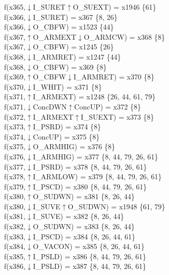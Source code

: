 f(x365,$\downarrow$I\_SURET$\uparrow$O\_SUEXT) = x1946 \{61\} \\  
f(x366,$\downarrow$I\_SURET) = x367 \{8, 26\} \\  
f(x366,$\downarrow$O\_CBFW) = x1523 \{44\} \\  
f(x367,$\uparrow$O\_ARMEXT$\downarrow$O\_ARMCW) = x368 \{8\} \\  
f(x367,$\downarrow$O\_CBFW) = x1245 \{26\} \\  
f(x368,$\downarrow$I\_ARMRET) = x1247 \{44\} \\  
f(x368,$\downarrow$O\_CBFW) = x369 \{8\} \\  
f(x369,$\uparrow$O\_CBFW$\downarrow$I\_ARMRET) = x370 \{8\} \\  
f(x370,$\downarrow$I\_WHIT) = x371 \{8\} \\  
f(x371,$\uparrow$I\_ARMEXT) = x1248 \{26, 44, 61, 79\} \\  
f(x371,$\downarrow$ConcDWN$\uparrow$ConcUP) = x372 \{8\} \\  
f(x372,$\uparrow$I\_ARMEXT$\uparrow$I\_SUEXT) = x373 \{8\} \\  
f(x373,$\uparrow$I\_PSRD) = x374 \{8\} \\  
f(x374,$\downarrow$ConcUP) = x375 \{8\} \\  
f(x375,$\downarrow$O\_ARMHIG) = x376 \{8\} \\  
f(x376,$\downarrow$I\_ARMHIG) = x377 \{8, 44, 79, 26, 61\} \\  
f(x377,$\downarrow$I\_PSRD) = x378 \{8, 44, 79, 26, 61\} \\  
f(x378,$\uparrow$I\_ARMLOW) = x379 \{8, 44, 79, 26, 61\} \\  
f(x379,$\uparrow$I\_PSCD) = x380 \{8, 44, 79, 26, 61\} \\  
f(x380,$\uparrow$O\_SUDWN) = x381 \{8, 26, 44\} \\  
f(x380,$\downarrow$I\_SUVE$\uparrow$O\_SUDWN) = x1948 \{61, 79\} \\  
f(x381,$\downarrow$I\_SUVE) = x382 \{8, 26, 44\} \\  
f(x382,$\downarrow$O\_SUDWN) = x383 \{8, 26, 44\} \\  
f(x383,$\downarrow$I\_PSCD) = x384 \{8, 26, 44, 61\} \\  
f(x384,$\downarrow$O\_VACON) = x385 \{8, 26, 44, 61\} \\  
f(x385,$\uparrow$I\_PSLD) = x386 \{8, 44, 79, 26, 61\} \\  
f(x386,$\downarrow$I\_PSLD) = x387 \{8, 44, 79, 26, 61\} \\  
